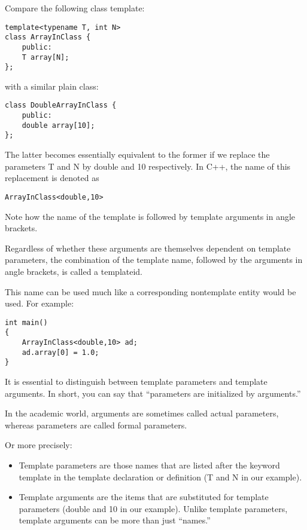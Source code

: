 
Compare the following class template:

\begin{lstlisting}[style=styleCXX]
template<typename T, int N>
class ArrayInClass {
	public:
	T array[N];
};
\end{lstlisting}

with a similar plain class:

\begin{lstlisting}[style=styleCXX]
class DoubleArrayInClass {
	public:
	double array[10];
};
\end{lstlisting}

The latter becomes essentially equivalent to the former if we replace the parameters T and N by double and 10 respectively. In C++, the name of this replacement is denoted as

\begin{lstlisting}[style=styleCXX]
ArrayInClass<double,10>
\end{lstlisting}

Note how the name of the template is followed by template arguments in angle brackets.

Regardless of whether these arguments are themselves dependent on template parameters, the combination of the template name, followed by the arguments in angle brackets, is called a templateid.

This name can be used much like a corresponding nontemplate entity would be used. For example:

\begin{lstlisting}[style=styleCXX]
int main()
{
	ArrayInClass<double,10> ad;
	ad.array[0] = 1.0;
}
\end{lstlisting}

It is essential to distinguish between template parameters and template arguments. In short, you can
say that “parameters are initialized by arguments.”

\begin{tcolorbox}[colback=webgreen!5!white,colframe=webgreen!75!black]
\hspace*{0.75cm}In the academic world, arguments are sometimes called actual parameters, whereas parameters are called formal parameters.
\end{tcolorbox}

Or more precisely:

\begin{itemize}
\item 
Template parameters are those names that are listed after the keyword template in the template declaration or definition (T and N in our example).

\item 
Template arguments are the items that are substituted for template parameters (double and 10 in our example). Unlike template parameters, template arguments can be more than just “names.”

\end{itemize}

